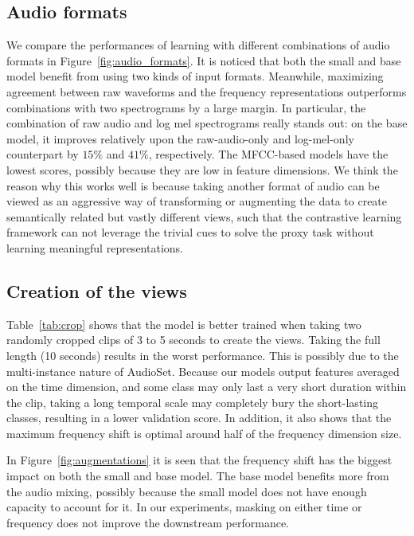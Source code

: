 \documentclass{article}
\begin{document}
\subsection{Audio formats}

We compare the performances of learning with different combinations of audio formats in Figure~\ref{fig:audio_formats}. It is noticed that both the small and base model benefit from using two kinds of input formats. Meanwhile, maximizing agreement between raw waveforms and the frequency representations outperforms combinations with two spectrograms by a large margin. In particular, the combination of raw audio and log mel spectrograms really stands out: on the base model, it improves relatively upon the raw-audio-only and log-mel-only counterpart by $15\%$ and $41\%$, respectively. The MFCC-based models have the lowest scores, possibly because they are low in feature dimensions. We think the reason why this works well is because taking another format of audio can be viewed as an aggressive way of transforming or augmenting the data to create semantically related but vastly different views, such that the contrastive learning framework can not leverage the trivial cues to solve the proxy task without learning meaningful representations.

\subsection{Creation of the views}

Table~\ref{tab:crop} shows that the model is better trained when taking two randomly cropped clips of 3 to 5 seconds to create the views. Taking the full length (10 seconds) results in the worst performance. This is possibly due to the multi-instance nature of AudioSet. Because our models output features averaged on the time dimension, and some class may only last a very short duration within the clip, taking a long temporal scale may completely bury the short-lasting classes, resulting in a lower validation score. In addition, it also shows that the maximum frequency shift is optimal around half of the frequency dimension size.


In Figure~\ref{fig:augmentations} it is seen that the frequency shift has the biggest impact on both the small and base model. The base model benefits more from the audio mixing, possibly because the small model does not have enough capacity to account for it. In our experiments, masking on either time or frequency does not improve the downstream performance.
\end{document}
